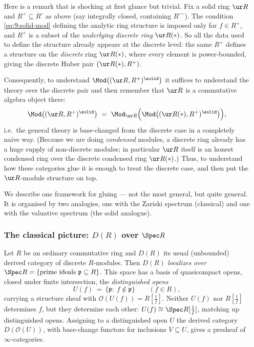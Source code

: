 \begin{remark}
\label{rmk:9:discrete-data}
Here is a remark that is shocking at first glance but trivial. Fix a solid ring
$\ur R$ and $R^{+}\subseteq R^{\circ}$ as above (say integrally closed,
containing $R^{\circ\circ}$). The condition \eqref{eq:9:solid-mod} defining the
analytic ring structure is imposed only for $f\in R^{+}$, and $R^{+}$ is a
subset of the \emph{underlying discrete ring} $\ur R(\ast)$. So all the data
used to define the structure already appears at the discrete level: the same
$R^{+}$ defines a structure on the \emph{discrete} ring $\ur R(\ast)$, where
every element is power-bounded, giving the discrete Huber pair
$(\ur R(\ast),R^{+})$.

Consequently, to understand $\Mod\bigl((\ur R,R^{+})^{\solid}\bigr)$ it suffices
to understand the theory over the discrete pair and then remember that $\ur R$
is a commutative algebra object there:
\begin{equation*}
\Mod\bigl((\ur R,R^{+})^{\solid}\bigr)\ =\ \Mod_{\ur R}\Bigl(\Mod\bigl(
(\ur R(\ast),R^{+})^{\solid}\bigr)\Bigr),
\end{equation*}
i.e.\ the general theory is base-changed from the discrete case in a completely
naive way. (Because we are doing \emph{condensed} modules, a discrete ring
already has a huge supply of non-discrete modules; in particular $\ur R$ itself
is an honest condensed ring over the discrete condensed ring $\ur R(\ast)$.)
Thus, to understand how these categories glue it is enough to treat the discrete
case, and then put the $\ur R$-module structure on top.
\end{remark}

We describe one framework for gluing --- not the most general, but quite
general. It is organised by two analogies, one with the Zariski spectrum
(classical) and one with the valuative spectrum (the solid analogue).

\subsubsection*{The classical picture: $D(R)$ over $\Spec R$}

\begin{remark}
\label{rmk:9:spec-analogy}
Let $R$ be an ordinary commutative ring and $D(R)$ its usual (unbounded)
derived category of discrete $R$-modules. Then $D(R)$ \emph{localizes over}
$\Spec R=\{\text{prime ideals }\mathfrak p\subseteq R\}$. This space has a basis
of quasicompact opens, closed under finite intersection, the
\emph{distinguished opens}
\begin{equation*}
U(f)\ =\ \{\mathfrak p:\ f\notin\mathfrak p\}\qquad(f\in R),
\end{equation*}
carrying a structure sheaf with $\mathcal O(U(f))=R[\tfrac1f]$. Neither $U(f)$
nor $R[\tfrac1f]$ determines $f$, but they determine each other:
$U(f)\cong\Spec R[\tfrac1f]$, matching up distinguished opens. Assigning to a
distinguished open $U$ the derived category $D(\mathcal O(U))$, with base-change
functors for inclusions $V\subseteq U$, gives a presheaf of $\infty$-categories.
\end{remark}

